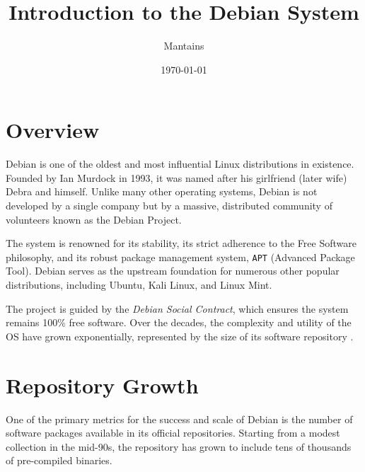 
\textwidth=159mm
\textheight=246mm
\oddsidemargin=0pt
\evensidemargin=0pt
\topmargin=0pt
\headheight=0pt
\headsep=0pt



\title{{\bf Introduction to the Debian System}}
\author{Mantains}
\date{\today}



\maketitle

\section{Overview}

Debian is one of the oldest and most influential Linux distributions in existence. Founded by Ian Murdock in 1993, it was named after his girlfriend (later wife) Debra and himself. Unlike many other operating systems, Debian is not developed by a single company but by a massive, distributed community of volunteers known as the Debian Project.

The system is renowned for its stability, its strict adherence to the Free Software philosophy, and its robust package management system, {\tt APT} (Advanced Package Tool). Debian serves as the upstream foundation for numerous other popular distributions, including Ubuntu, Kali Linux, and Linux Mint.

The project is guided by the {\it Debian Social Contract}, which ensures the system remains 100\% free software. Over the decades, the complexity and utility of the OS have grown exponentially, represented by the size of its software repository \cite{debianhistory}.

\section{Repository Growth}

One of the primary metrics for the success and scale of Debian is the number of software packages available in its official repositories. Starting from a modest collection in the mid-90s, the repository has grown to include tens of thousands of pre-compiled binaries.


